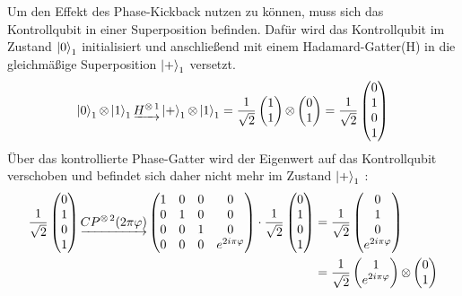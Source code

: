 Um den Effekt des Phase-Kickback nutzen zu können, 
muss sich das Kontrollqubit in einer Superposition befinden.
Dafür wird das Kontrollqubit im Zustand \(\ket{0}_1\) initialisiert und
anschließend mit einem Hadamard-Gatter(H) in die gleichmäßige Superposition \(\ket{+}_1\) versetzt.
\[\ket{0}_1 \operatorname{\otimes} \ket{1}_1 
\underrightarrow{H^{\operatorname{\otimes}1}}
 \ket{+}_1 \operatorname{\otimes} \ket{1}_1
=
\frac{1}{\sqrt{2}}
\begin{pmatrix}
  1 \\
  1
 \end{pmatrix}
 \operatorname{\otimes}
 \begin{pmatrix}
  0 \\
  1 
 \end{pmatrix}
 =
 \frac{1}{\sqrt{2}}
 \begin{pmatrix}
  0 \\
  1 \\
  0 \\
  1
\end{pmatrix}
 \]
Über das kontrollierte Phase-Gatter wird der Eigenwert auf das Kontrollqubit verschoben und
befindet sich daher nicht mehr im Zustand \(\ket{+}_1\) :
\begin{align*}
  \frac{1}{\sqrt{2}}
  \begin{pmatrix}
   0 \\
   1 \\
   0 \\
   1
  \end{pmatrix}
  \underrightarrow{CP^{\operatorname{\otimes}2}(2 \pi \varphi)}
  \begin{pmatrix}
    1 & 0 & 0 & 0\\
    0 & 1 & 0 & 0\\
    0 & 0 & 1 & 0\\
    0 & 0 & 0 & e^{2 i \pi \varphi}
  \end{pmatrix}
  \cdot
  \frac{1}{\sqrt{2}}
  \begin{pmatrix}
   0 \\
   1 \\
   0 \\
   1
  \end{pmatrix}
  &=
  \frac{1}{\sqrt{2}}
  \begin{pmatrix}
    0 \\
    1 \\
    0 \\
    e^{2 i \pi \varphi}
  \end{pmatrix} \\
  &=
  \frac{1}{\sqrt{2}}
  \begin{pmatrix}
    1 \\
    e^{2 i \pi \varphi}
   \end{pmatrix}
   \operatorname{\otimes}
   \begin{pmatrix}
    0 \\
    1 
   \end{pmatrix}
\end{align*}
